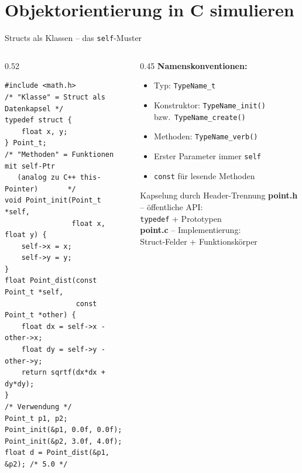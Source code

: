 \documentclass[%
  aspectratio=169,
  10pt
]{beamer}
\begin{document}
\section{Objektorientierung in C simulieren}

\begin{frame}[fragile]{Structs als Klassen -- das \texttt{self}-Muster}
  \begin{columns}[T]
    \begin{column}{0.52\textwidth}
\begin{lstlisting}
#include <math.h>
/* "Klasse" = Struct als Datenkapsel */
typedef struct {
    float x, y;
} Point_t;
/* "Methoden" = Funktionen mit self-Ptr
   (analog zu C++ this-Pointer)       */
void Point_init(Point_t *self,
                float x, float y) {
    self->x = x;
    self->y = y;
}
float Point_dist(const Point_t *self,
                 const Point_t *other) {
    float dx = self->x - other->x;
    float dy = self->y - other->y;
    return sqrtf(dx*dx + dy*dy);
}
/* Verwendung */
Point_t p1, p2;
Point_init(&p1, 0.0f, 0.0f);
Point_init(&p2, 3.0f, 4.0f);
float d = Point_dist(&p1, &p2); /* 5.0 */
\end{lstlisting}
    \end{column}
    \begin{column}{0.45\textwidth}
      \textbf{Namenskonventionen:}
      \begin{itemize}
        \item Typ: \texttt{TypeName\_t}
        \item Konstruktor: \texttt{TypeName\_init()} \\
              bzw.\ \texttt{TypeName\_create()}
        \item Methoden: \texttt{TypeName\_verb()}
        \item Erster Parameter immer \texttt{self}
        \item \texttt{const} für lesende Methoden
      \end{itemize}
      \vspace{0.3em}
      \begin{block}{Kapselung durch Header-Trennung}
        \textbf{point.h} -- öffentliche API:\\
        \texttt{typedef} + Prototypen\\[0.3em]
        \textbf{point.c} -- Implementierung:\\
        Struct-Felder + Funktionskörper\\[0.3em]

\end{block}
\end{column}
\end{columns}
\end{frame}
\end{document}
